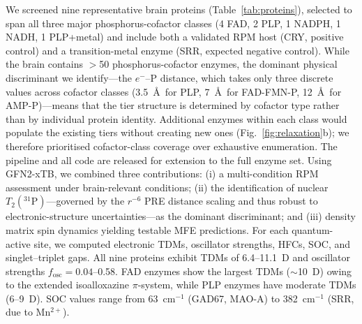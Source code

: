 \documentclass[11pt]{article}
\begin{document}
We screened nine representative brain proteins (Table~\ref{tab:proteins}), selected to span all three major phosphorus-cofactor classes (4 FAD, 2 PLP, 1 NADPH, 1 NADH, 1 PLP+metal) and include both a validated RPM host (CRY, positive control) and a transition-metal enzyme (SRR, expected negative control). While the brain contains $>$50 phosphorus-cofactor enzymes, the dominant physical discriminant we identify---the $e^-$--P distance, which takes only three discrete values across cofactor classes (3.5~\AA\ for PLP, 7~\AA\ for FAD-FMN-P, 12~\AA\ for AMP-P)---means that the tier structure is determined by cofactor type rather than by individual protein identity. Additional enzymes within each class would populate the existing tiers without creating new ones (Fig.~\ref{fig:relaxation}b); we therefore prioritised cofactor-class coverage over exhaustive enumeration. The pipeline and all code are released for extension to the full enzyme set. Using GFN2-xTB\cite{Bannwarth2019}, we combined three contributions: (i) a multi-condition RPM assessment under brain-relevant conditions; (ii) the identification of nuclear $T_2(^{31}\mathrm{P})$---governed by the $r^{-6}$ PRE distance scaling\cite{Solomon1955} and thus robust to electronic-structure uncertainties---as the dominant discriminant; and (iii) density matrix spin dynamics yielding testable MFE predictions. For each quantum-active site, we computed electronic TDMs, oscillator strengths, HFCs, SOC, and singlet--triplet gaps. All nine proteins exhibit TDMs of 6.4--11.1~D and oscillator strengths $f_\mathrm{osc} = 0.04$--0.58. FAD enzymes show the largest TDMs ($\sim$10~D) owing to the extended isoalloxazine $\pi$-system, while PLP enzymes have moderate TDMs (6--9~D). SOC values range from 63~cm$^{-1}$ (GAD67, MAO-A) to 382~cm$^{-1}$ (SRR, due to Mn$^{2+}$).
\end{document}

